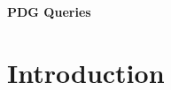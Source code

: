 \documentclass{article}
\theoremstyle{plain}
\theoremstyle{definition}
\begin{document}
\begin{center}
	{\bfseries\Large PDG Queries}
\end{center}	
	
\section{Introduction}
\end{document}
